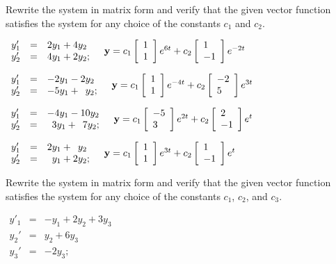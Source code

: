 \begin{exerciselist}
  \item\label{exer:10.2.1} Rewrite the system in matrix form and verify that the given vector
        function satisfies the system for any choice of the constants $c_{1}$ and $c_{2}$.

  \begin{alist}
    \item %
    $\begin{array}{ccl}
      y'_{1} & = & 2y_{1}+4y_{2}  \\
      y_{2}' & = & 4y_{1}+2y_{2};
    \end{array}\quad{\bf y}=c_{1}\left[\begin{array}{l}1\\1\end{array}\right]e^{6t}+c_{2}\left[\begin{array}{l}1\\-1\end{array}\right]e^{-2t}$

    \item %
    $\begin{array}{ccl}
      y'_{1} & = & -2y_{1}-2y_{2}            \\
      y_{2}' & = & -5y_{1}+\phantom{2}y_{2};
    \end{array}\quad{\bf y}=c_{1}\left[\begin{array}{l}1\\1\end{array}\right]e^{-4t}+c_{2}\left[\begin{array}{l}-2\\5\end{array}\right]e^{3t}$

    \item %
    $\begin{array}{ccr}
      y'_{1} & = & -4y_{1}-10y_{2}           \\
      y_{2}' & = & 3y_{1}+\phantom{1}7y_{2};
    \end{array}\quad{\bf y}=c_{1}\left[\begin{array}{l}-5\\3\end{array}\right]e^{2t}+c_{2}\left[\begin{array}{l}2\\-1\end{array}\right]e^{t}$

    \item %
    $\begin{array}{ccl}
      y'_{1} & = & 2y_{1}+\phantom{2}y_{2}  \\
      y_{2}' & = & \phantom{2}y_{1}+2y_{2};
    \end{array}\quad{\bf y}=c_{1}\left[\begin{array}{l}1\\1\end{array}\right]e^{3t}+c_{2}\left[\begin{array}{l}1\\-1\end{array}\right]e^{t}$
  \end{alist}

  \item\label{exer:10.2.2} Rewrite the system in matrix form and verify that the given vector
        function satisfies the system for any choice of the constants $c_{1}$, $c_{2}$, and $c_{3}$.

  \begin{alist}
    \item %
    $\begin{array}{ccr}
      y'_{1} & = & -y_{1}+2y_{2}+3y_{3} \\
      y_{2}' & = & y_{2}+6y_{3}         \\
      y_{3}' & = & -2y_{3};
    \end{array}$


\end{alist}
\end{exerciselist}

